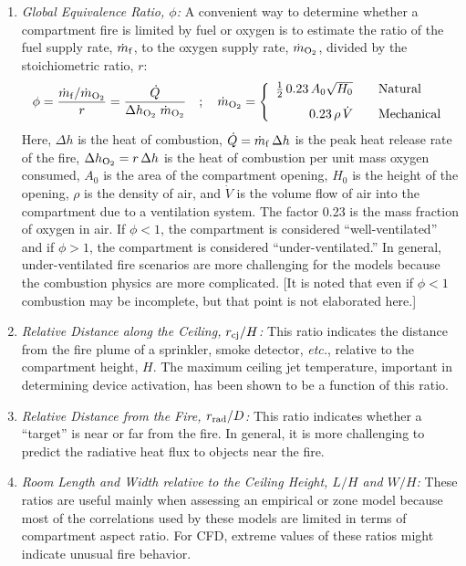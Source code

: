 \documentclass[graybox]{svmult}
\begin{document}
\begin{enumerate}
\item {\em Global Equivalence Ratio, $\phi$:}
A convenient way to determine whether a compartment fire is limited by fuel or oxygen is to estimate the ratio of the fuel supply rate, $\dot{m}_{\rm f}$, to the oxygen supply rate, $\dot{m}_{\rm O_2}$, divided by the stoichiometric ratio, $r$:
\begin{equation}
   \phi = \frac{\dot{m}_{\rm f}/\dot{m}_{\rm O_2}}{r} = \frac{\dot{Q}}{\Delta h_{\rm O_2} \; \dot{m}_{\rm O_2} } \quad ; \quad  \dot{m}_{\rm O_2} = \left\{
   \begin{array}{r@{\quad \quad}l}
      \frac{1}{2} \, 0.23 \, A_0 \sqrt{H_0} & \hbox{Natural} \\ [0.1in]
      0.23 \, \rho \, \dot{V}       & \hbox{Mechanical} \end{array} \right.
\end{equation}
Here, $\Delta h$ is the heat of combustion, $\dot{Q}=\dot{m}_{\rm f} \, \Delta h$ is the peak heat release rate of the fire, $\Delta h_{\rm O_2}=r \, \Delta h$ is the heat of combustion per unit mass oxygen consumed, $A_0$ is the area of the compartment opening, $H_0$ is the height of the opening, $\rho$ is the density of air, and $\dot{V}$ is the volume flow of air into the compartment due to a ventilation system. The factor 0.23 is the mass fraction of oxygen in air. If $\phi<1$, the compartment is considered ``well-ventilated'' and if $\phi>1$, the compartment is considered ``under-ventilated.'' In general, under-ventilated fire scenarios are more challenging for the models because the combustion physics are more complicated. [It is noted that even if $\phi<1$ combustion may be incomplete, but that point is not elaborated here.]

\item {\em Relative Distance along the Ceiling, $r_{\rm cj}/H$:}
This ratio indicates the distance from the fire plume of a sprinkler, smoke detector, {\em etc.}, relative to the
compartment height, $H$. The maximum ceiling jet temperature, important  in determining device activation, has been shown to be a function of this ratio.

\item {\em Relative Distance from the Fire, $r_{\rm rad}/D$:}
This ratio indicates whether a ``target'' is near or far from the fire. In general, it is more challenging to predict the radiative heat flux to objects near the fire.

\item {\em Room Length and Width relative to the Ceiling Height, $L/H$ and $W/H$:}
These ratios are useful mainly when assessing an empirical or zone model because most of the correlations used by these models are limited in terms of compartment aspect ratio. For CFD, extreme values of these ratios might indicate unusual fire behavior.


\end{enumerate}
\end{document}
